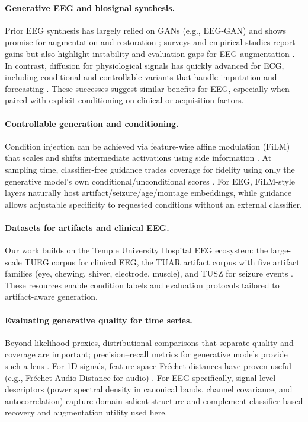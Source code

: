 \documentclass{article}
\begin{document}
\paragraph{Generative EEG and biosignal synthesis.}
Prior EEG synthesis has largely relied on GANs (e.g., EEG-GAN) and shows promise for augmentation and restoration \citep{hartmann2018eeggan}; surveys and empirical studies report gains but also highlight instability and evaluation gaps for EEG augmentation \citep{habashi2023gansurvey}. In contrast, diffusion for physiological signals has quickly advanced for ECG, including conditional and controllable variants that handle imputation and forecasting \citep{neifar2023diffecg}. These successes suggest similar benefits for EEG, especially when paired with explicit conditioning on clinical or acquisition factors.

\paragraph{Controllable generation and conditioning.}
Condition injection can be achieved via feature-wise affine modulation (FiLM) that scales and shifts intermediate activations using side information \citep{perez2018film}. At sampling time, classifier-free guidance trades coverage for fidelity using only the generative model’s own conditional/unconditional scores \citep{ho2022cfg}. For EEG, FiLM-style layers naturally host artifact/seizure/age/montage embeddings, while guidance allows adjustable specificity to requested conditions without an external classifier.

\paragraph{Datasets for artifacts and clinical EEG.}
Our work builds on the Temple University Hospital EEG ecosystem: the large-scale TUEG corpus for clinical EEG, the TUAR artifact corpus with five artifact families (eye, chewing, shiver, electrode, muscle), and TUSZ for seizure events \citep{obeid2016tueg,hamid2020tuar,shah2018tusz}. These resources enable condition labels and evaluation protocols tailored to artifact-aware generation.

\paragraph{Evaluating generative quality for time series.}
Beyond likelihood proxies, distributional comparisons that separate quality and coverage are important; precision–recall metrics for generative models provide such a lens \citep{kynkaanniemi2019ipr}. For 1D signals, feature-space Fréchet distances have proven useful (e.g., Fréchet Audio Distance for audio) \citep{kilgour2019fad}. For EEG specifically, signal-level descriptors (power spectral density in canonical bands, channel covariance, and autocorrelation) capture domain-salient structure and complement classifier-based recovery and augmentation utility used here.
\end{document}
